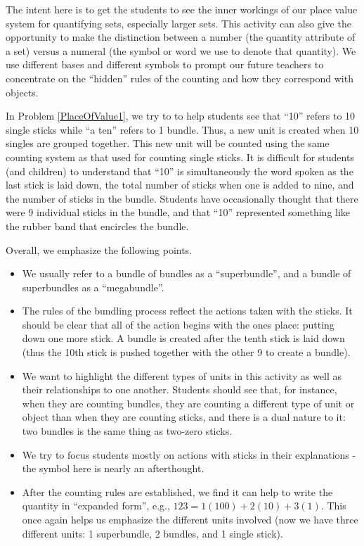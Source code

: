 \documentclass[nooutcomes]{ximera}
\begin{document}
\newpage
\begin{instructorNotes}
The intent here is to get the students to see the inner workings of our 
place value system for quantifying sets, especially larger sets.  This activity can also give the opportunity to make the distinction between a number (the quantity attribute of a set) versus a numeral (the symbol or word we use to denote that quantity). We use different bases and different symbols to prompt our future teachers 
to concentrate on the ``hidden'' rules of the counting and how they correspond with objects.

In Problem \ref{PlaceOfValue1}, we try to to help students see that ``10'' refers to 10 single sticks while ``a ten'' refers to 1 bundle.  Thus, a new unit is created when 10 singles are grouped together.  This new unit will be counted using the same counting system as that used for counting single sticks.  It is difficult for students (and children) to understand that ``10'' is simultaneously the word spoken as the last stick is laid down, the total number of sticks when one is added to nine, and the number of sticks in the bundle.  Students have occasionally thought that there were 9 individual sticks in the bundle, and that ``10'' represented something like the rubber band that encircles the bundle.

Overall, we emphasize the following points.
\begin{itemize}
    \item We usually refer to a bundle of bundles as a ``superbundle'', and a bundle of superbundles as a ``megabundle''.
	\item The rules of the bundling process reflect the actions taken with the sticks. It should be clear that all of the action begins with the ones place:  putting down one more stick. 
	A bundle is created after the tenth stick is laid down (thus the 10th stick is pushed together with the other 9 to create a bundle).
	\item We want to highlight the different types of units in this activity as well as their relationships to one another.  Students should see that, for instance, when they are counting bundles, they are counting a different type of unit or object than when they are counting sticks, and there is a dual nature to it: two bundles is the same thing as two-zero sticks.
	\item We try to focus students mostly on actions with sticks in their explanations - the symbol here is nearly an afterthought.
	\item After the counting rules are established, we find it can help to write the quantity in ``expanded form'', e.g., $123 = 1(100) + 2(10) + 3(1)$. This once again helps us emphasize the different units involved (now we have three different units: 1 superbundle, 2 bundles, and 1 single stick).


\end{itemize}
\end{instructorNotes}
\end{document}
